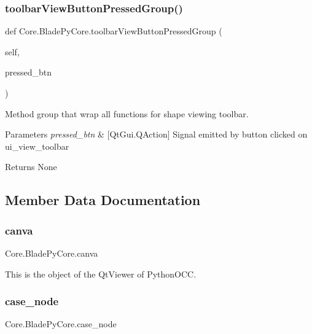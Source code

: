 \subsubsection{\texorpdfstring{toolbar\+View\+Button\+Pressed\+Group()}{toolbarViewButtonPressedGroup()}}
{\footnotesize\ttfamily def Core.\+Blade\+Py\+Core.\+toolbar\+View\+Button\+Pressed\+Group (\begin{DoxyParamCaption}\item[{}]{self,  }\item[{}]{pressed\+\_\+btn }\end{DoxyParamCaption})}



Method group that wrap all functions for shape viewing toolbar. 


\begin{DoxyParams}{Parameters}
{\em pressed\+\_\+btn} & \mbox{[}Qt\+Gui.\+Q\+Action\mbox{]} Signal emitted by button clicked on ui\+\_\+view\+\_\+toolbar \\
\hline
\end{DoxyParams}
\begin{DoxyReturn}{Returns}
None 
\end{DoxyReturn}


\subsection{Member Data Documentation}
\hypertarget{class_core_1_1_blade_py_core_ab277fbfb8af6b2ef9aff8d06c9f5cc82}{}\label{class_core_1_1_blade_py_core_ab277fbfb8af6b2ef9aff8d06c9f5cc82} 
\subsubsection{\texorpdfstring{canva}{canva}}
{\footnotesize\ttfamily Core.\+Blade\+Py\+Core.\+canva}



This is the object of the Qt\+Viewer of Python\+O\+CC. 

\hypertarget{class_core_1_1_blade_py_core_a76f4a1191b8d68c0ed9d9f3e1e6756d8}{}\label{class_core_1_1_blade_py_core_a76f4a1191b8d68c0ed9d9f3e1e6756d8} 
\subsubsection{\texorpdfstring{case\+\_\+node}{case\_node}}
{\footnotesize\ttfamily Core.\+Blade\+Py\+Core.\+case\+\_\+node}



